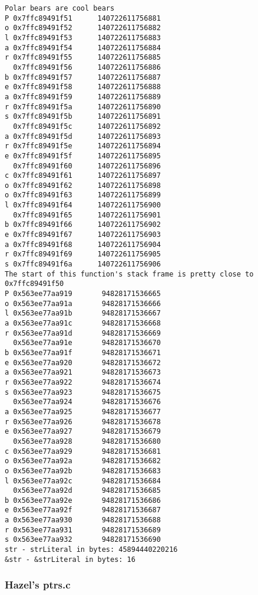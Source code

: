 \documentclass[11pt]{article}
\begin{document}
\begin{enumerate}
\begin{verbatim}
Polar bears are cool bears
P 0x7ffc89491f51      140722611756881
o 0x7ffc89491f52      140722611756882
l 0x7ffc89491f53      140722611756883
a 0x7ffc89491f54      140722611756884
r 0x7ffc89491f55      140722611756885
  0x7ffc89491f56      140722611756886
b 0x7ffc89491f57      140722611756887
e 0x7ffc89491f58      140722611756888
a 0x7ffc89491f59      140722611756889
r 0x7ffc89491f5a      140722611756890
s 0x7ffc89491f5b      140722611756891
  0x7ffc89491f5c      140722611756892
a 0x7ffc89491f5d      140722611756893
r 0x7ffc89491f5e      140722611756894
e 0x7ffc89491f5f      140722611756895
  0x7ffc89491f60      140722611756896
c 0x7ffc89491f61      140722611756897
o 0x7ffc89491f62      140722611756898
o 0x7ffc89491f63      140722611756899
l 0x7ffc89491f64      140722611756900
  0x7ffc89491f65      140722611756901
b 0x7ffc89491f66      140722611756902
e 0x7ffc89491f67      140722611756903
a 0x7ffc89491f68      140722611756904
r 0x7ffc89491f69      140722611756905
s 0x7ffc89491f6a      140722611756906
The start of this function's stack frame is pretty close to 0x7ffc89491f50
P 0x563ee77aa919       94828171536665
o 0x563ee77aa91a       94828171536666
l 0x563ee77aa91b       94828171536667
a 0x563ee77aa91c       94828171536668
r 0x563ee77aa91d       94828171536669
  0x563ee77aa91e       94828171536670
b 0x563ee77aa91f       94828171536671
e 0x563ee77aa920       94828171536672
a 0x563ee77aa921       94828171536673
r 0x563ee77aa922       94828171536674
s 0x563ee77aa923       94828171536675
  0x563ee77aa924       94828171536676
a 0x563ee77aa925       94828171536677
r 0x563ee77aa926       94828171536678
e 0x563ee77aa927       94828171536679
  0x563ee77aa928       94828171536680
c 0x563ee77aa929       94828171536681
o 0x563ee77aa92a       94828171536682
o 0x563ee77aa92b       94828171536683
l 0x563ee77aa92c       94828171536684
  0x563ee77aa92d       94828171536685
b 0x563ee77aa92e       94828171536686
e 0x563ee77aa92f       94828171536687
a 0x563ee77aa930       94828171536688
r 0x563ee77aa931       94828171536689
s 0x563ee77aa932       94828171536690
str - strLiteral in bytes: 45894440220216
&str - &strLiteral in bytes: 16
\end{verbatim}
\end{enumerate}



\subsubsection{Hazel's ptrs.c}
\label{sec:org8cfd7c1}
\end{document}
